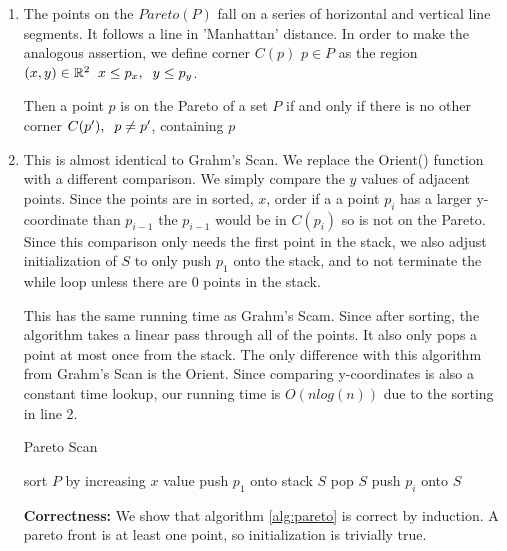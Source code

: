 \documentclass[11pt]{article}
\begin{document}
\begin{enumerate}[1. ]
    \item The points on the $Pareto(P)$ fall on a series of horizontal and vertical line segments.
    It follows a line in 'Manhattan' distance. In order to make the analogous assertion,
    we define corner $C(p)$ $p \in P$ as the region $(x,y) \in \reals ^2 \sp x \leq p_x, \sp y \leq p_y$.
    

    Then a point $p$ is on the Pareto of a set $P$ if and only if
    there is no other corner $C(p'), \sp p \neq p'$, containing $p$

    \item 
    This is almost identical to Grahm's Scan. We replace the Orient() function with a different comparison.
    We simply compare the $y$ values of adjacent points. Since the points are in sorted, $x$, order
    if a a point $p_i$ has a larger y-coordinate than $p_{i-1}$ the $p_{i-1}$ would be in $C(p_i)$ so is not on the Pareto.
    Since this comparison only needs the first point in the stack, we also adjust initialization of $S$
    to only push $p_1$ onto the stack, and to not terminate the while loop unless there are $0$ points in the stack.
    
    This has the same running time as Grahm's Scam. Since after sorting, the algorithm takes a linear pass through
    all of the points. It also only pops a point at most once from the stack. The only difference with this algorithm
    from Grahm's Scan is the Orient. Since comparing y-coordinates is also a constant time lookup, our running time is $O(n log(n))$
    due to the sorting in line 2.
    \begin{algorithm}
        \caption{Pareto Scan}
        \label{alg:pareto}
        \begin{algorithmic}[1]
            \State sort $P$ by increasing $x$ value
            \State push $p_1$ onto stack $S$
                    \State pop $S$
                \EndWhile
                \State push $p_i$ onto $S$
            \EndFor
        \EndFunction
        \end{algorithmic}
    \end{algorithm}

    \textbf{Correctness:} We show that algorithm \ref{alg:pareto} is correct by induction. 
    A pareto front is at least one point, so initialization is trivially true.


\end{enumerate}
\end{document}
